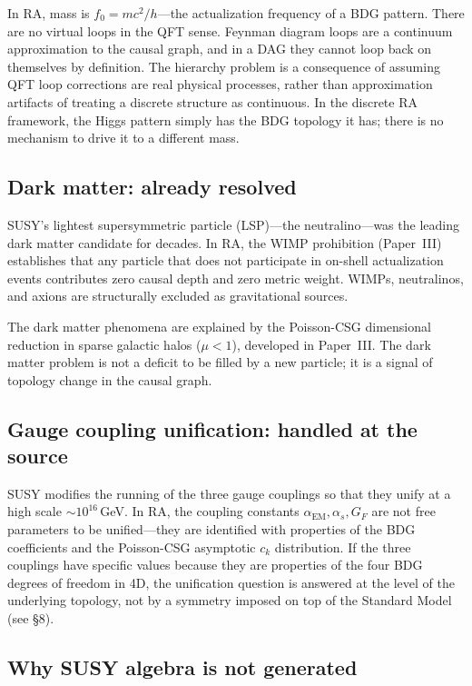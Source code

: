 \documentclass[11pt]{article}
\begin{document}
In RA, mass is $f_0=mc^2/h$---the actualization frequency of a BDG pattern. There are no virtual loops in the QFT sense. Feynman diagram loops are a continuum approximation to the causal graph, and in a DAG they cannot loop back on themselves by definition. The hierarchy problem is a consequence of assuming QFT loop corrections are real physical processes, rather than approximation artifacts of treating a discrete structure as continuous. In the discrete RA framework, the Higgs pattern simply has the BDG topology it has; there is no mechanism to drive it to a different mass.

\subsection{Dark matter: already resolved}

SUSY's lightest supersymmetric particle (LSP)---the neutralino---was the leading dark matter candidate for decades. In RA, the WIMP prohibition (Paper~III) establishes that any particle that does not participate in on-shell actualization events contributes zero causal depth and zero metric weight. WIMPs, neutralinos, and axions are structurally excluded as gravitational sources.

The dark matter phenomena are explained by the Poisson-CSG dimensional reduction in sparse galactic halos ($\mu<1$), developed in Paper~III. The dark matter problem is not a deficit to be filled by a new particle; it is a signal of topology change in the causal graph.

\subsection{Gauge coupling unification: handled at the source}

SUSY modifies the running of the three gauge couplings so that they unify at a high scale $\sim 10^{16}$\,GeV. In RA, the coupling constants $\alpha_{\mathrm{EM}},\alpha_s,G_F$ are not free parameters to be unified---they are identified with properties of the BDG coefficients and the Poisson-CSG asymptotic $c_k$ distribution. If the three couplings have specific values because they are properties of the four BDG degrees of freedom in 4D, the unification question is answered at the level of the underlying topology, not by a symmetry imposed on top of the Standard Model (see \S8).

\subsection{Why SUSY algebra is not generated}
\end{document}
